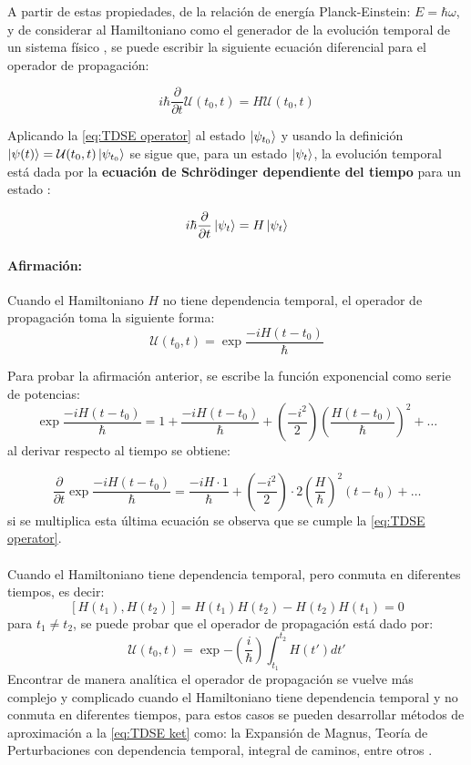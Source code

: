 A partir de estas propiedades, de la relación de energía Planck-Einstein: $E=\hbar\omega$, y de considerar al Hamiltoniano como el generador de la evolución temporal de un sistema físico \cite{Sakurai:1994}, se puede escribir la siguiente ecuación diferencial para el operador de propagación:

\begin{equation}
  \label{eq:TDSE operator}
  i\hbar\frac{\partial}{\partial t}\mathcal{U}(t_0,t) = H\mathcal{U}(t_0,t)
\end{equation}

Aplicando la \autoref{eq:TDSE operator} al estado $\ket{\psi_{t_0}}$ y usando la definición $\ket{\psi(t)}=\mathcal{U}(t_0,t)\ket{\psi_{t_0}}$ se sigue que, para un estado $\ket{\psi_{t}}$, la evolución temporal está dada por la \textbf{ecuación de Schrödinger dependiente del tiempo} para un estado \cite{Tannor:2006}:

\begin{tcolorbox}[colback=CTtitle!5!white,colframe=CTtitle!85!white]%
\begin{equation}
\label{eq:TDSE ket}
i\hbar\frac{\partial}{\partial t}\ket{\psi_{t}} = H\ket{\psi_{t}}
\end{equation}
\end{tcolorbox}

\paragraph{Afirmación:}
  Cuando el Hamiltoniano $H$ no tiene dependencia temporal, el operador de propagación toma la siguiente forma:
\begin{equation}
\label{eq:U IT}
\mathcal{U}(t_0,t) = \exp{\frac{-iH(t-t_0)}{\hbar}}
\end{equation}

Para probar la afirmación anterior, se escribe la función exponencial como serie de potencias:
$$\exp{\frac{-iH(t-t_0)}{\hbar}} = 1 + \frac{-iH(t-t_0)}{\hbar}+ \left(\frac{-i^2}{2}\right)\left(\frac{H(t-t_0)}{\hbar}\right)^2+\dots $$
al derivar respecto al tiempo se obtiene:

$$\frac{\partial}{\partial t}\exp{\frac{-iH(t-t_0)}{\hbar}} = \frac{-iH\cdot 1}{\hbar}+ \left(\frac{-i^2}{2}\right)\cdot 2\left(\frac{H}{\hbar}\right)^2(t-t_0)+\dots $$
si se multiplica esta última ecuación se observa que se cumple la \autoref{eq:TDSE operator}.
\\\\
Cuando el Hamiltoniano tiene dependencia temporal, pero conmuta en diferentes tiempos, es decir:
$$[H(t_1), H(t_2)] = H(t_1)H(t_2) - H(t_2)H(t_1)=0$$
para $t_1 \neq t_2$, se puede probar que el operador de propagación está dado por:
$$\mathcal{U}(t_0,t) = \exp{-\left( \frac{i}{\hbar}\right)\int_{t_1}^{t_2}H(t')dt'}$$
Encontrar de manera analítica el operador de propagación se vuelve más complejo y complicado cuando el Hamiltoniano tiene dependencia temporal y no conmuta en diferentes tiempos, para estos casos se pueden desarrollar métodos de aproximación a la \autoref{eq:TDSE ket} como: la Expansión de Magnus, Teoría de Perturbaciones con dependencia temporal, integral de caminos, entre otros \cite{Begzjav2020,Picasso2012}.


